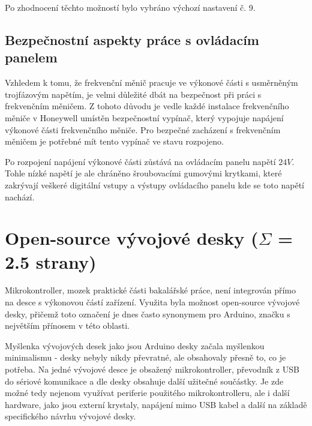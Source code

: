 Po zhodnocení těchto možností bylo vybráno výchozí nastavení č. 9.

\subsection{Bezpečnostní aspekty práce s ovládacím panelem}

Vzhledem k tomu, že frekvenční měnič pracuje ve výkonové části s usměrněným trojfázovým napětím, je velmi důležité dbát na bezpečnost při práci s frekvenčním měničem. Z tohoto důvodu je vedle každé instalace frekvenčního měniče v Honeywell umístěn bezpečnostní vypínač, který vypojuje napájení výkonové části frekvenčního měniče. Pro bezpečné zacházení s frekvenčním měničem je potřebné mít tento vypínač ve stavu rozpojeno.

Po rozpojení napájení výkonové části zůstává na ovládacím panelu napětí $24V$. Tohle nízké napětí je ale chráněno šroubovacími gumovými krytkami, které zakrývají veškeré digitální vstupy a výstupy ovládacího panelu kde se toto napětí nachází.

\section{Open-source vývojové desky ($\Sigma$ = 2.5 strany)}

Mikrokontroller, mozek praktické části bakalářské práce, není integrován přímo na desce s výkonovou částí zařízení. Využita byla možnost open-source vývojové desky, přičemž toto označení je dnes často synonymem pro Arduino, značku s největším přínosem v této oblasti.

Myšlenka vývojových desek jako jsou Arduino desky začala myšlenkou minimalismu - desky nebyly nikdy převratné, ale obsahovaly přesně to, co je potřeba. Na jedné vývojové desce je obsažený mikrokontroller, převodník z USB do sériové komunikace a dle desky obsahuje další užitečné součástky. Je zde možné tedy nejenom využívat periferie použitého mikrokontrolleru, ale i další hardware, jako jsou externí krystaly, napájení mimo USB kabel a další na základě specifického návrhu vývojové desky.
\cite{KnihaOArduinu}


